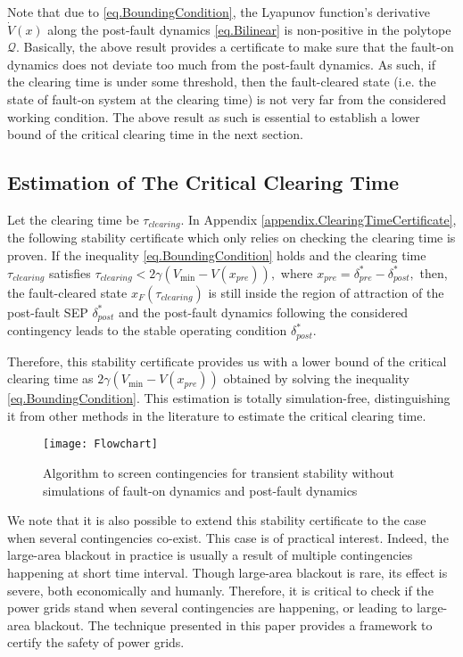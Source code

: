 \documentclass[final]{IEEEtran}
\begin{document}
Note that due to \eqref{eq.BoundingCondition}, the Lyapunov
function's derivative $\dot{V}(x)$ along the post-fault dynamics
\eqref{eq.Bilinear} is non-positive in the polytope $\mathcal{Q}.$
Basically, the above result provides a certificate to make sure
that the fault-on dynamics does not deviate too much from the
post-fault dynamics. As such, if the clearing time is under some
threshold, then the fault-cleared state (i.e. the state of
fault-on system at the clearing time) is not very far from the
considered working condition. The above result as such is
essential to establish a lower bound of the critical clearing time
in the next section.


\subsection{Estimation of The Critical Clearing Time}
\label{sec.EstimationCCT}

Let the clearing time be $\tau_{clearing}.$ In Appendix
\ref{appendix.ClearingTimeCertificate}, the following stability
certificate which only relies on checking the clearing time is
proven. If the inequality \eqref{eq.BoundingCondition} holds and
the clearing time $\tau_{clearing}$ satisfies
$\tau_{clearing}<2\gamma (V_{\min}-V(x_{pre})),$ where
$x_{pre}=\delta^*_{pre}-\delta^*_{post},$  then, the fault-cleared
state $x_F(\tau_{clearing})$ is still inside the region of
attraction of the post-fault SEP $\delta^*_{post}$ and the
post-fault dynamics following the considered contingency leads to
the stable operating condition $\delta^*_{post}$.

Therefore, this stability certificate provides us with a lower
bound of the critical clearing time as $2\gamma
(V_{\min}-V(x_{pre}))$ obtained by solving the inequality
\eqref{eq.BoundingCondition}. This estimation is totally
simulation-free,  distinguishing it from other methods in the
literature to estimate the critical clearing time.

\begin{figure}[t!]
\centering
\texttt{[image: Flowchart]}
\caption{Algorithm to screen contingencies for transient stability
without simulations of fault-on dynamics and post-fault
dynamics}\label{flowchart}
\end{figure}




We note that it is also possible to extend this stability
certificate to the case when several contingencies co-exist. This
case is of practical interest. Indeed, the large-area blackout in
practice is usually  a result of multiple contingencies happening
at short time interval. Though large-area blackout is rare, its
effect is severe, both economically and humanly. Therefore, it is
critical  to check if the power grids stand when several
contingencies are happening, or leading to large-area blackout.
The technique presented in this paper provides a framework to
certify the safety of power grids.
\end{document}
